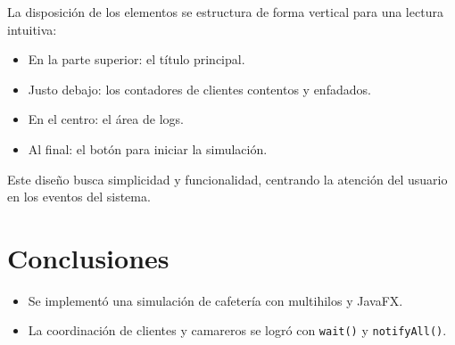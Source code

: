 \documentclass[12pt,a4paper]{article}
\begin{document}
La disposición de los elementos se estructura de forma vertical para una lectura intuitiva:
\begin{itemize}
    \item En la parte superior: el título principal.
    \item Justo debajo: los contadores de clientes contentos y enfadados.
    \item En el centro: el área de logs.
    \item Al final: el botón para iniciar la simulación.
\end{itemize}

Este diseño busca simplicidad y funcionalidad, centrando la atención del usuario en los eventos del sistema.

\section{Conclusiones}
\begin{itemize}
    \item Se implementó una simulación de cafetería con multihilos y JavaFX.
    \item La coordinación de clientes y camareros se logró con \texttt{wait()} y \texttt{notifyAll()}.
\end{itemize}
\end{document}

